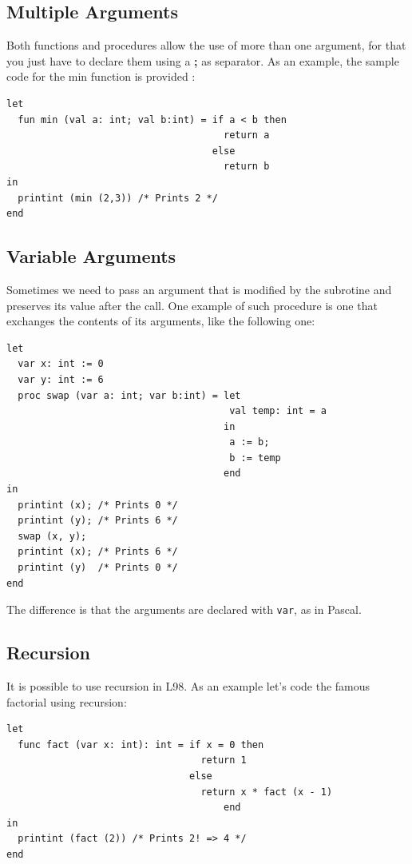 \documentclass[a4paper, 11pt]{report}
\newcommand{\keyword}[1]{\texttt{#1}}
\begin{document}
\subsection{Multiple Arguments}
Both functions and procedures allow the use of more than one argument,
for that you just have to declare them using a \textbf{;} as separator. As
an example, the sample code for the min function is provided :

\begin{lstlisting}
let
  fun min (val a: int; val b:int) = if a < b then
                                      return a
                                    else
                                      return b
in
  printint (min (2,3)) /* Prints 2 */
end
\end{lstlisting}

\subsection{Variable Arguments}
Sometimes we need to pass an argument that is modified by the subrotine and
preserves its value after the call. One example of such procedure is one that
exchanges the contents of its arguments, like the following one:

\begin{lstlisting}
let
  var x: int := 0
  var y: int := 6
  proc swap (var a: int; var b:int) = let
                                       val temp: int = a
                                      in
                                       a := b;
                                       b := temp
                                      end
in
  printint (x); /* Prints 0 */
  printint (y); /* Prints 6 */
  swap (x, y);
  printint (x); /* Prints 6 */
  printint (y)  /* Prints 0 */
end
\end{lstlisting}

The difference is that the arguments are declared with \keyword{var}, as in Pascal.

\subsection{Recursion}

It is possible to use recursion in L98. As an example let's code the
famous factorial using recursion:

\begin{lstlisting}
let
  func fact (var x: int): int = if x = 0 then
                                  return 1
                                else
                                  return x * fact (x - 1)
                                      end
in
  printint (fact (2)) /* Prints 2! => 4 */
end
\end{lstlisting}
\end{document}
